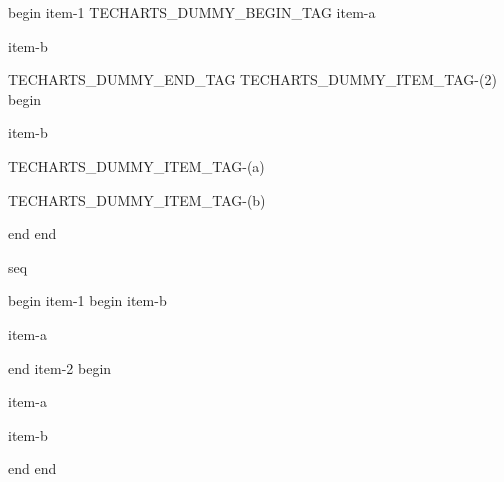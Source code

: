 begin
item-1
TECHARTS_DUMMY_BEGIN_TAG
item-a

item-b

TECHARTS_DUMMY_END_TAG
TECHARTS_DUMMY_ITEM_TAG-(2)
begin

item-b %

TECHARTS_DUMMY_ITEM_TAG-(a)

TECHARTS_DUMMY_ITEM_TAG-(b)

end
end

seq

begin
item-1
begin
item-b

item-a

end
item-2
begin

item-a

item-b

end
end